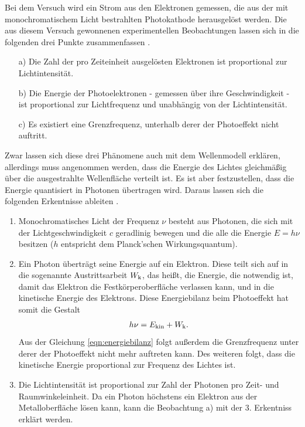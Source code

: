 \noindent
Bei dem Versuch wird ein Strom aus den Elektronen gemessen, die aus der mit monochromatischem Licht bestrahlten Photokathode herausgelöst werden. Die aus
diesem Versuch gewonnenen experimentellen Beobachtungen lassen sich in die folgenden drei Punkte zusammenfassen \cite{Anleitung500}.
\begin{itemize}
    \item[a)] Die Zahl der pro Zeiteinheit ausgelösten Elektronen ist proportional zur Lichtintensität.
    \item[b)] Die Energie der Photoelektronen - gemessen über ihre Geschwindigkeit - ist proportional zur Lichtfrequenz und unabhängig von der Lichtintensität.
    \item[c)] Es existiert eine Grenzfrequenz, unterhalb derer der Photoeffekt nicht auftritt.
\end{itemize}
Zwar lassen sich diese drei Phänomene auch mit dem Wellenmodell erklären, allerdings muss angenommen werden, dass die Energie des Lichtes gleichmäßig über die
ausgestrahlte Wellenfläche verteilt ist. Es ist aber festzustellen, dass die Energie quantisiert in Photonen übertragen wird. Daraus lassen sich die folgenden Erkentnisse
ableiten \cite{Anleitung500}.
\begin{enumerate}
    \item Monochromatisches Licht der Frequenz $\nu$ besteht aus Photonen, die sich mit der Lichtgeschwindigkeit $c$ geradlinig bewegen und die alle die Energie $E=h\nu$ 
        besitzen ($h$ entspricht dem Planck'schen Wirkungsquantum).
    \item Ein Photon überträgt seine Energie auf ein Elektron. Diese teilt sich auf in die sogenannte Austrittsarbeit $W_{\text k}$, das heißt, die Energie, 
        die notwendig ist, damit das Elektron die Festkörperoberfläche verlassen kann, und in die kinetische Energie des Elektrons. Diese Energiebilanz beim Photoeffekt 
        hat somit die Gestalt
        \begin{align}
            \label{eqn:energiebilanz}
            h\nu = E_{\text{kin}} + W_{\text k}.
        \end{align}
        Aus der Gleichung \eqref{eqn:energiebilanz} folgt außerdem die Grenzfrequenz unter derer der Photoeffekt nicht mehr auftreten kann. Des weiteren folgt, dass die kinetische
        Energie proportional zur Frequenz des Lichtes ist.
        \item Die Lichtintensität ist proportional zur Zahl der Photonen pro Zeit- und Raumwinkeleinheit. Da ein Photon höchstens ein Elektron aus der Metalloberfläche lösen kann, kann die Beobachtung a) mit der
            3. Erkentniss erklärt werden.
\end{enumerate}

